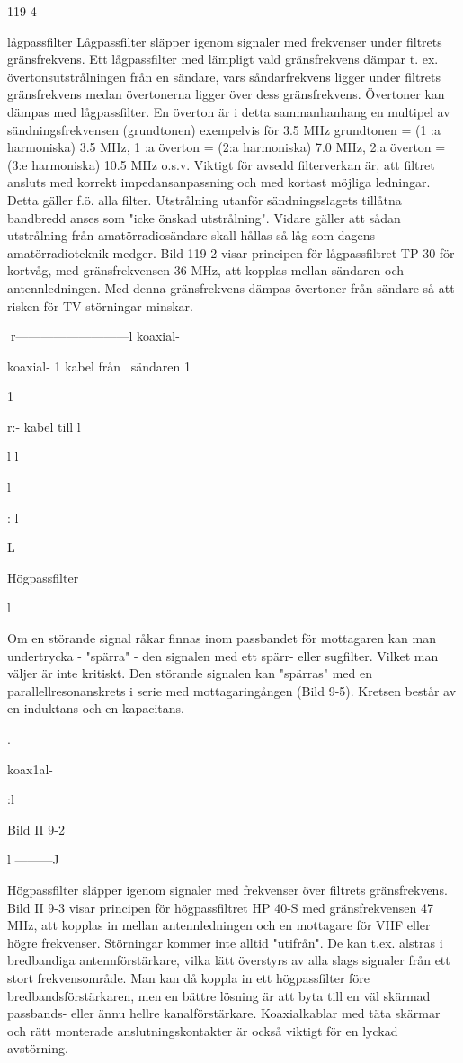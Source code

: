 119-4

lågpassfilter
Lågpassfilter släpper igenom signaler med
frekvenser under filtrets gränsfrekvens.
Ett lågpassfilter med lämpligt vald gränsfrekvens dämpar t. ex. övertonsutstrålningen
från en sändare, vars såndarfrekvens ligger
under filtrets gränsfrekvens medan övertonerna ligger över dess gränsfrekvens.
Övertoner kan dämpas med lågpassfilter. En överton är i detta sammanhanhang
en multipel av sändningsfrekvensen (grundtonen) exempelvis för 3.5 MHz
grundtonen = (1 :a harmoniska) 3.5 MHz,
1 :a överton = (2:a harmoniska) 7.0 MHz,
2:a överton = (3:e harmoniska) 10.5 MHz
o.s.v.
Viktigt för avsedd filterverkan är, att filtret
ansluts med korrekt impedansanpassning
och med kortast möjliga ledningar. Detta
gäller f.ö. alla filter.
Utstrålning utanför sändningsslagets tillåtna bandbredd anses som "icke önskad
utstrålning". Vidare gäller att sådan utstrålning från amatörradiosändare skall hållas så
låg som dagens amatörradioteknik medger.
Bild 119-2 visar principen för lågpassfiltret TP
30 för kortvåg, med gränsfrekvensen 36
MHz, att kopplas mellan sändaren och antennledningen. Med denna gränsfrekvens
dämpas övertoner från sändare så att risken
för TV-störningar minskar.

r---------------------------l koaxial-

koaxial- 1
kabel från~
sändaren 1

1

r:- kabel till
l

l
l

l

:
l

L---------------

Högpassfilter

l

Om en störande signal råkar finnas inom
passbandet för mottagaren kan man undertrycka - "spärra" - den signalen med ett
spärr- eller sugfilter. Vilket man väljer är inte
kritiskt.
Den störande signalen kan "spärras" med
en parallellresonanskrets i serie med
mottagaringången (Bild 9-5). Kretsen består av en induktans och en kapacitans.

.

koax1al-

:l

Bild II 9-2

l
---------J

Högpassfilter släpper igenom signaler med
frekvenser över filtrets gränsfrekvens.
Bild II 9-3 visar principen för högpassfiltret HP 40-S med gränsfrekvensen 47 MHz,
att kopplas in mellan antennledningen och
en mottagare för VHF eller högre frekvenser.
Störningar kommer inte alltid "utifrån".
De kan t.ex. alstras i bredbandiga antennförstärkare, vilka lätt överstyrs av alla slags
signaler från ett stort frekvensområde. Man
kan då koppla in ett högpassfilter före bredbandsförstärkaren, men en bättre lösning är
att byta till en väl skärmad passbands- eller
ännu hellre kanalförstärkare.
Koaxialkablar med täta skärmar och rätt
monterade anslutningskontakter är också
viktigt för en lyckad avstörning.

